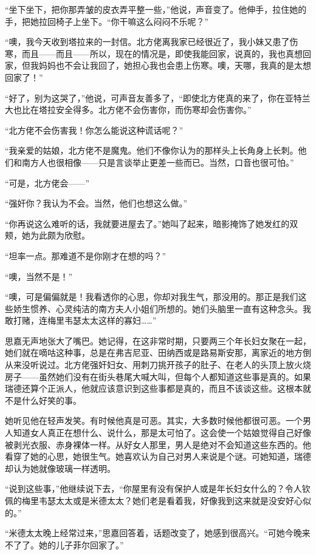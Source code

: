 \par “坐下坐下，把你那弄皱的皮衣弄平整一些，”他说，声音变了。他伸手，拉住她的手，把她拉回椅子上坐下。“你干嘛这么闷闷不乐呢？”
\par “噢，我今天收到塔拉来的一封信。北方佬离我家已经很近了，我小妹又患了伤寒，而且——而且——所以，现在的情况是，即使我能回家，说真的，我也真想回家，但我妈妈也不会让我回了，她担心我也会患上伤寒。噢，天哪，我真的是太想回家了！”
\par “好了，别为这哭了，”他说，可声音友善多了，“即使北方佬真的来了，你在亚特兰大也比在塔拉安全得多。北方佬不会伤害你，而伤寒却会伤害你。”
\par “北方佬不会伤害我！你怎么能说这种谎话呢？”
\par “我亲爱的姑娘，北方佬不是魔鬼。他们不像你认为的那样头上长角身上长刺。他们和南方人也很相像——只是言谈举止更差一些而已。当然，口音也很可怕。”
\par “可是，北方佬会——”
\par “强奸你？我认为不会。当然，他们也想这么做。”
\par “你再说这么难听的话，我就要进屋去了。”她叫了起来，暗影掩饰了她发红的双颊，她为此颇为欣慰。
\par “坦率一点。那难道不是你刚才在想的吗？”
\par “噢，当然不是！”
\par “噢，可是偏偏就是！我看透你的心思，你却对我生气，那没用的。那正是我们这些娇生惯养、心灵纯洁的南方夫人小姐们所想的。她们头脑里一直有这种念头。我敢打赌，连梅里韦瑟太太这样的寡妇……”
\par 思嘉无声地张大了嘴巴。她记得，在这非常时期，只要两三个年长妇女聚在一起，她们就在嘀咕这种事，总是在弗吉尼亚、田纳西或是路易斯安那，离家近的地方倒从来没听说过。北方佬强奸妇女、用刺刀挑开孩子的肚子、在老人的头顶上放火烧房子——虽然她们没有在街头巷尾大喊大叫，但每个人都知道这些事是真的。如果瑞德还算个正派人，他就应该意识到这些事都是真的，而且不该谈这些。这根本就不是什么好笑的事。
\par 她听见他在轻声发笑。有时候他真是可恶。其实，大多数时候他都很可恶。一个男人知道女人真正在想什么、说什么，那是太可怕了。这会使一个姑娘觉得自己好像被剥光衣服、赤身裸体一样。从好女人那里，男人是绝对不会知道这些东西的。他看穿了她的心思，她很生气。她喜欢认为自己对男人来说是个谜。可她知道，瑞德却认为她就像玻璃一样透明。
\par “说到这些事，”他继续说下去，“你屋里有没有保护人或是年长妇女什么的？令人钦佩的梅里韦瑟太太或是米德太太？她们老是看着我，好像我到这来就是没安好心似的。”
\par “米德太太晚上经常过来，”思嘉回答着，话题改变了，她感到很高兴。“可她今晚来不了了。她的儿子菲尔回家了。”
